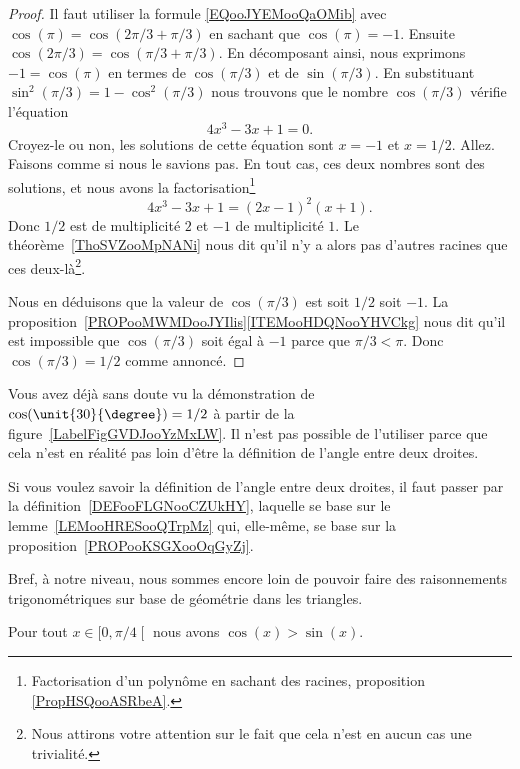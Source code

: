\begin{proof}
	Il faut utiliser la formule \eqref{EQooJYEMooQaOMib} avec \( \cos(\pi)=\cos(2\pi/3+\pi/3)\) en sachant que \( \cos(\pi)=-1\). Ensuite \( \cos(2\pi/3)=\cos(\pi/3+\pi/3)\). En décomposant ainsi, nous exprimons \( -1=\cos(\pi)\) en termes de \( \cos(\pi/3)\) et de \( \sin(\pi/3)\). En substituant \( \sin^2(\pi/3)=1-\cos^2(\pi/3)\) nous trouvons que le nombre \( \cos(\pi/3)\) vérifie l'équation
	\begin{equation}
		4x^3-3x+1=0.
	\end{equation}
	Croyez-le ou non, les solutions de cette équation sont \( x=-1\) et \( x=1/2\). Allez. Faisons comme si nous le savions pas. En tout cas, ces deux nombres sont des solutions, et nous avons la factorisation\footnote{Factorisation d'un polynôme en sachant des racines, proposition \ref{PropHSQooASRbeA}.}
	\begin{equation}
		4x^3-3x+1=(2x-1)^2(x+1).
	\end{equation}
	Donc \( 1/2\) est de multiplicité \( 2\) et \( -1\) de multiplicité \( 1\). Le théorème~\ref{ThoSVZooMpNANi} nous dit qu'il n'y a alors pas d'autres racines que ces deux-là\footnote{Nous attirons votre attention sur le fait que cela n'est en aucun cas une trivialité.}.

	Nous en déduisons que la valeur de \( \cos(\pi/3)\) est soit \( 1/2\) soit \( -1\). La proposition~\ref{PROPooMWMDooJYIlis}\ref{ITEMooHDQNooYHVCkg} nous dit qu'il est impossible que \( \cos(\pi/3)\) soit égal à \( -1\) parce que \( \pi/3<\pi\). Donc \( \cos(\pi/3)=1/2\) comme annoncé.
\end{proof}

\begin{remark}
	Vous avez déjà sans doute vu la démonstration de \( \cos(\unit{30}{\degree})=1/2\) à partir de la figure~\ref{LabelFigGVDJooYzMxLW}. Il n'est pas possible de l'utiliser parce que cela n'est en réalité pas loin d'être la définition de l'angle entre deux droites.

	Si vous voulez savoir la définition de l'angle entre deux droites, il faut passer par la définition~\ref{DEFooFLGNooCZUkHY}, laquelle se base sur le lemme~\ref{LEMooHRESooQTrpMz} qui, elle-même, se base sur la proposition~\ref{PROPooKSGXooOqGyZj}.

	Bref, à notre niveau, nous sommes encore loin de pouvoir faire des raisonnements trigonométriques sur base de géométrie dans les triangles.
\end{remark}

\begin{proposition}     \label{PROPooJFAGooYjRJcb}
	Pour tout \( x\in \mathopen[ 0 , \pi/4 \mathclose[\) nous avons \( \cos(x)>\sin(x)\).
\end{proposition}

